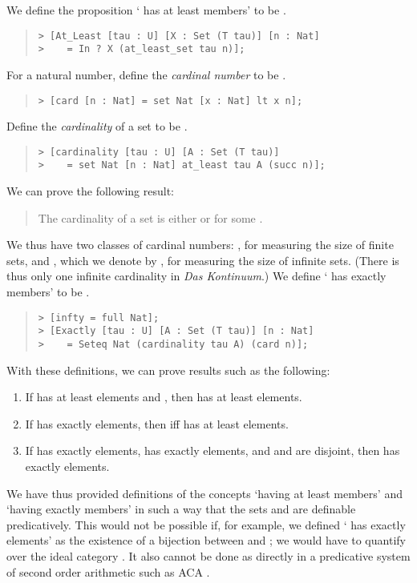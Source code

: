 \documentclass[acmtocl]{acmtrans2m}
\begin{document}
We define the proposition ` has at least  members' to be .
\begin{quote}
\begin{verbatim}
> [At_Least [tau : U] [X : Set (T tau)] [n : Nat]
>    = In ? X (at_least_set tau n)];
\end{verbatim}
\end{quote}

For  a natural number, define the \emph{cardinal number}  to be .
\begin{quote}
\begin{verbatim}
> [card [n : Nat] = set Nat [x : Nat] lt x n];
\end{verbatim}
\end{quote}
Define the \emph{cardinality} of a set  to be .
\begin{quote}
\begin{verbatim}
> [cardinality [tau : U] [A : Set (T tau)]
>    = set Nat [n : Nat] at_least tau A (succ n)];
\end{verbatim}
\end{quote}
We can prove the following result:
\begin{quote}
The cardinality  of a set  is either  or  for some .
\end{quote}
We thus have two classes of cardinal numbers: , for measuring the size of finite sets, and , which we denote by , for measuring the size of infinite sets.  (There is thus only one infinite cardinality in \emph{Das Kontinuum}.)  We define ` has exactly  members' to be .
\begin{quote}
\begin{verbatim}
> [infty = full Nat];
> [Exactly [tau : U] [A : Set (T tau)] [n : Nat]
>    = Seteq Nat (cardinality tau A) (card n)];
\end{verbatim}
\end{quote}
\pagebreak
With these definitions, we can prove results such as the following:
\begin{enumerate}
\item
If  has at least  elements and , then  has at least  elements.
\item
If  has exactly  elements, then  iff  has at least  elements.
\item
If  has exactly  elements,  has exactly  elements, and  and  are disjoint, then  has exactly  elements.
\end{enumerate}

We have thus provided definitions of the concepts `having at least  members' and `having exactly  members' in such a way that the sets
 and 
are definable predicatively.  This would not be possible if, for example, we defined ` has exactly  elements' as the existence
of a bijection between  and ; we would have to quantify over the ideal category .  It also cannot be
done as directly in a predicative system of second order arithmetic
such as ACA \cite{simpson:sosoa}.
\end{document}
